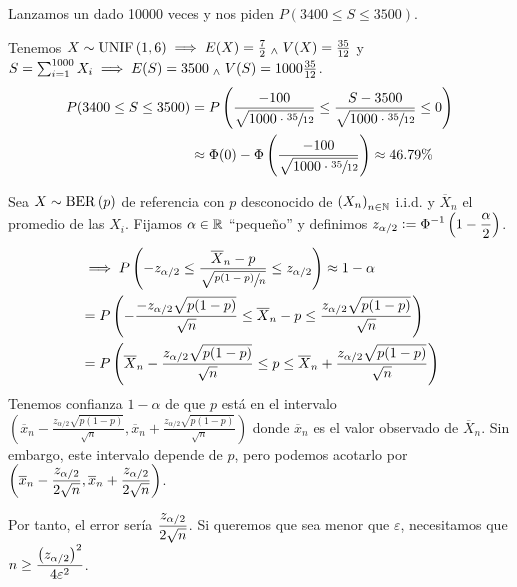 \begin{ejem}
	Lanzamos un dado 10000 veces y nos piden $P(3400 \leq S \leq 3500)$.

	Tenemos $X\sim \operatorname{UNIF}\left(1,6\right) \implies E(X) = \frac{7}{2} \; _{\wedge} \; V(X) = \frac{35}{12}$ y $S = \sum_{i=1}^{1000} X_i \implies E(S) = 3500 \; _{\wedge} \; V(S) = 1000\frac{35}{12}$.
	\[\begin{aligned}
			P(3400 \leq S \leq 3500) & = P\left(\frac{-100}{\sqrt{1000 \cdot \sfrac{35}{12}}} \leq \frac{S-3500}{\sqrt{1000\cdot \sfrac{35}{12}}} \leq 0\right) \\
			                         & \approx \Phi(0) - \Phi\left(\frac{-100}{\sqrt{1000\cdot \sfrac{35}{12}}}\right) \approx 46.79\%
		\end{aligned}\]
\end{ejem}

\begin{ejem}
	Sea $X\sim \operatorname{BER}\left(p\right)$ de referencia con $p$ desconocido de $\left(X_n\right)_{n\in\mathbb{N}}$ i.i.d. y $\overline{X}_n$ el promedio de las $X_i$. Fijamos $\alpha \in \mathbb{R}$ ``pequeño'' y definimos $\displaystyle z_{\alpha/2} \vcentcolon= \Phi^{-1}\left(1-\frac{\alpha}{2}\right)$.
	\[\begin{aligned}
			 & \implies P\left(-z_{\alpha/2} \leq \frac{\overline{X}_n - p}{\sqrt{\sfrac{p(1-p)}{n}}} \leq z_{\alpha/2}\right) \approx 1-\alpha                    \\
			 & = P\left(-\frac{-z_{\alpha/2}\sqrt{p(1-p)}}{\sqrt{n}} \leq \overline{X}_n - p \leq \frac{z_{\alpha/2}\sqrt{p(1-p)}}{\sqrt{n}}\right)                \\
			 & = P\left(\overline{X}_n - \frac{z_{\alpha/2}\sqrt{p(1-p)}}{\sqrt{n}} \leq p \leq \overline{X}_n + \frac{z_{\alpha/2}\sqrt{p(1-p)}}{\sqrt{n}}\right)
		\end{aligned}\]
	Tenemos confianza $1-\alpha$ de que $p$ está en el intervalo $\left(\overline{x}_n - \frac{z_{\alpha/2}\sqrt{p(1-p)}}{\sqrt{n}}, \overline{x}_n + \frac{z_{\alpha/2}\sqrt{p(1-p)}}{\sqrt{n}}\right)$ donde $\overline{x}_n$ es el valor observado de $\overline{X}_n$. Sin embargo, este intervalo depende de $p$, pero podemos acotarlo por $\displaystyle \left(\overline{x}_n - \frac{z_{\alpha/2}}{2\sqrt{n}}, \overline{x}_n + \frac{z_{\alpha/2}}{2\sqrt{n}}\right)$.

	Por tanto, el error sería $\displaystyle \frac{z_{\alpha/2}}{2\sqrt{n}}$. Si queremos que sea menor que $\varepsilon$, necesitamos que $\displaystyle n \geq \frac{\left(z_{\alpha/2}\right)^2}{4\varepsilon^2}$.
\end{ejem}

